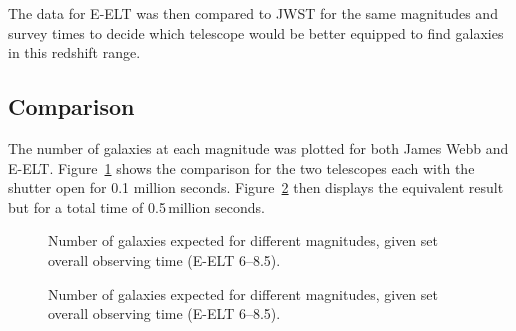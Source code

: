 		The data for E-ELT was then compared to JWST for the same magnitudes and survey times to decide which telescope would be better equipped to find galaxies in this redshift range.

	\subsection{Comparison} %
	\label{sub:comparison}
		The number of galaxies at each magnitude was plotted for both James Webb and E-ELT. Figure~\ref{fig:GRAPH_Mag_vs_galaxies_JWST_ELT_05} shows the comparison for the two telescopes each with the shutter open for 0.1 million seconds. Figure~\ref{fig:GRAPH_Mag_vs_galaxies_JWST_ELT_10} then displays the equivalent result but for a total time of 0.5\,million seconds.
		\begin{figure}[!htbp]
			\centering
				\begingroup{}
					\resizebox{0.8\textwidth}{!}{%
						
					}\endgroup
			\caption{Number of galaxies expected for different magnitudes, given set overall observing time (E-ELT 6--8.5).\label{fig:GRAPH_Mag_vs_galaxies_JWST_ELT_05}}
		\end{figure}
		\begin{figure}[!htbp]
			\centering
				\begingroup{}
					\resizebox{0.8\textwidth}{!}{%
						
					}\endgroup
			\caption{Number of galaxies expected for different magnitudes, given set overall observing time (E-ELT 6--8.5).\label{fig:GRAPH_Mag_vs_galaxies_JWST_ELT_10}}
		\end{figure}

